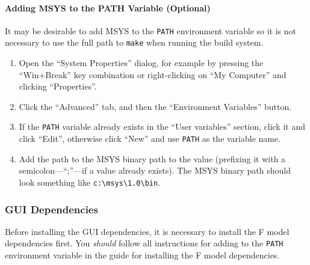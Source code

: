 \paragraph{Adding MSYS to the PATH Variable (Optional)}

It may be desirable to add MSYS to the \verb|PATH| environment variable so it is not necessary to 
use the full path to \verb|make| when running the build system.

\begin{enumerate}

\item Open the ``System Properties'' dialog, for example by pressing the ``Win+Break'' key 
combination or right-clicking on ``My Computer'' and clicking ``Properties''.

\item Click the ``Advanced'' tab, and then the ``Environment Variables'' button.

\item If the \verb|PATH| variable already exists in the ``User variables'' section, click it and 
click ``Edit'', otherwise click ``New'' and use \verb|PATH| as the variable name.

\item Add the path to the MSYS binary path to the value (prefixing it with a semicolon---``;''---if 
a value already exists).  The MSYS binary path should look something like \verb|c:\msys\1.0\bin|.

\end{enumerate}


\subsubsection{GUI Dependencies}

Before installing the GUI dependencies, it is necessary to install the F model dependencies first.  
You \emph{should} follow all instructions for adding to the \verb|PATH| environment variable in the 
guide for installing the F model dependencies.


